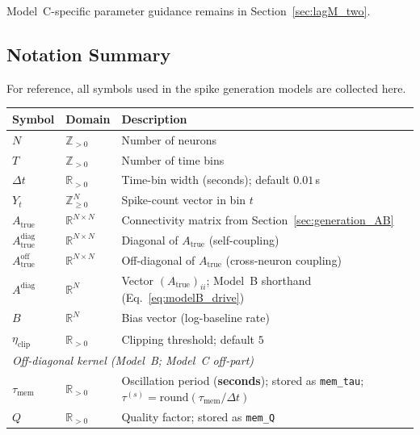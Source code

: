 \documentclass[11pt]{article}
\begin{document}
Model~C-specific parameter guidance remains in
Section~\ref{sec:lagM_two}.

\newpage
\subsection{Notation Summary}
\label{sec:notation}

For reference, all symbols used in the spike generation models are
collected here.

\begin{table}[h]
\centering
\begingroup
\renewcommand{\arraystretch}{1.22}
\begin{tabular}{lll}
\toprule
Symbol & Domain & Description \\
\midrule
$N$    & $\mathbb{Z}_{>0}$ & Number of neurons \\
$T$    & $\mathbb{Z}_{>0}$ & Number of time bins \\
$\Delta t$ & $\mathbb{R}_{>0}$ &
  Time-bin width (seconds); default $0.01$\,s \\
$Y_t$  & $\mathbb{Z}_{\geq 0}^{N}$ &
  Spike-count vector in bin $t$ \\
$A_{\text{true}}$ & $\mathbb{R}^{N\times N}$ &
  Connectivity matrix from Section~\ref{sec:generation_AB} \\
$A_{\text{true}}^{\mathrm{diag}}$ & $\mathbb{R}^{N\times N}$ &
  Diagonal of $A_{\text{true}}$ (self-coupling) \\
$A_{\text{true}}^{\mathrm{off}}$ & $\mathbb{R}^{N\times N}$ &
  Off-diagonal of $A_{\text{true}}$ (cross-neuron coupling) \\
$A^{\mathrm{diag}}$ & $\mathbb{R}^{N}$ &
  Vector $(A_{\text{true}})_{ii}$; Model~B shorthand (Eq.~\ref{eq:modelB_drive}) \\
$B$    & $\mathbb{R}^{N}$ &
  Bias vector (log-baseline rate) \\
$\eta_{\mathrm{clip}}$ & $\mathbb{R}_{>0}$ &
  Clipping threshold; default $5$ \\
\midrule
\multicolumn{3}{l}{\textit{Off-diagonal kernel (Model~B; Model~C off-part)}} \\
$\tau_{\mathrm{mem}}$ & $\mathbb{R}_{>0}$ &
  Oscillation period (\textbf{seconds}); stored as \texttt{mem\_tau}; $\tau^{(s)}=\mathrm{round}(\tau_{\mathrm{mem}}/\Delta t)$ \\
$Q$    & $\mathbb{R}_{>0}$ &
  Quality factor; stored as \texttt{mem\_Q} \\

\end{tabular}
\end{table}
\end{document}

